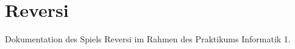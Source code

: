\chapter{Reversi}
\hypertarget{index}{}\label{index}
Dokumentation des Spiels Reversi im Rahmen des Praktikums Informatik 1. 